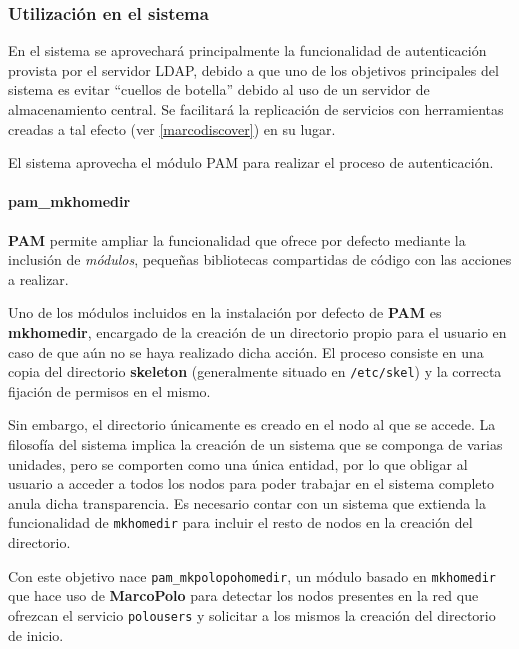 \subsubsection{Utilización en el sistema}

En el sistema se aprovechará principalmente la funcionalidad de autenticación provista por el servidor LDAP, debido a que uno de los objetivos principales del sistema es evitar ``cuellos de botella'' debido al uso de un servidor de almacenamiento central. Se facilitará la replicación de servicios con herramientas creadas a tal efecto (ver \ref{marcodiscover}) en su lugar.%

El sistema aprovecha el módulo PAM para realizar el proceso de autenticación.

\paragraph{pam\_mkhomedir}
\label{pam_mkpolohomedir}

\textbf{PAM} permite ampliar la funcionalidad que ofrece por defecto mediante la inclusión de \textit{módulos}, pequeñas bibliotecas compartidas de código con las acciones a realizar.

Uno de los módulos incluidos en la instalación por defecto de \textbf{PAM} es \textbf{mkhomedir}, encargado de la creación de un directorio propio para el usuario en caso de que aún no se haya realizado dicha acción. El proceso consiste en una copia del directorio \textbf{skeleton} (generalmente situado en \texttt{/etc/skel}) y la correcta fijación de permisos en el mismo.

Sin embargo, el directorio únicamente es creado en el nodo al que se accede. La filosofía del sistema implica la creación de un sistema que se componga de varias unidades, pero se comporten como una única entidad, por lo que obligar al usuario a acceder a todos los nodos para poder trabajar en el sistema completo anula dicha transparencia. Es necesario contar con un sistema que extienda la funcionalidad de \texttt{mkhomedir} para incluir el resto de nodos en la creación del directorio.

Con este objetivo nace \texttt{pam\_mkpolopohomedir}, un módulo basado en \texttt{mkhomedir} que hace uso de \textbf{MarcoPolo} para detectar los nodos presentes en la red que ofrezcan el servicio \texttt{polousers} y solicitar a los mismos la creación del directorio de inicio.

